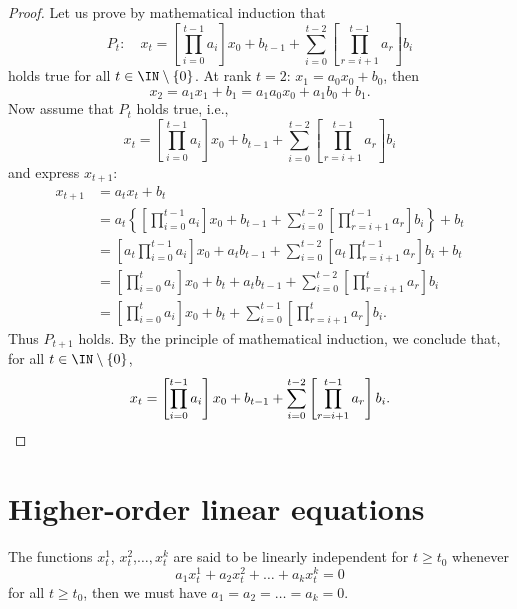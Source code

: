 \begin{proof}
Let us prove by mathematical induction that
\[
P_t:\quad
x_t=\left [\prod_{i=0}^{t-1} a_i\right ]x_0 +b_{t-1}+\sum_{i=0}^{t-2}\left [ \prod_{r=i+1}^{t-1} a_r \right]b_i
\]
holds true for all $t\in \IN\setminus\{0\}$.
At rank $t=2$: $x_1=a_0x_0+b_0$, then
$$x_2=a_1x_1+b_1=a_1a_0x_0+a_1b_0+b_1.$$
Now assume that $P_t$ holds true, i.e., 
$$x_t=\left [\prod_{i=0}^{t-1} a_i\right ]x_0 +b_{t-1}+\sum_{i=0}^{t-2}\left [ \prod_{r=i+1}^{t-1} a_r \right]b_i$$
and express $x_{t+1}$:
\begin{align*}
x_{t+1} &= a_tx_t+b_t \\
&=a_t\left\{\left[\prod_{i=0}^{t-1} a_i\right]x_0 +b_{t-1}
+\sum_{i=0}^{t-2}\left[\prod_{r=i+1}^{t-1} a_r \right]b_i \right\}+b_t \\
&=\left[a_t\prod_{i=0}^{t-1} a_i\right ]x_0+a_tb_{t-1}+\sum_{i=0}^{t-2}\left [ a_t\prod_{r=i+1}^{t-1} a_r \right]b_i+b_t \\
&=\left [\prod_{i=0}^{t} a_i\right ]x_0+b_t+a_tb_{t-1}+\sum_{i=0}^{t-2}\left [ \prod_{r=i+1}^{t} a_r \right]b_i \\
&= \left [\prod_{i=0}^{t} a_i\right ]x_0+b_t
+\sum_{i=0}^{t-1}\left [ \prod_{r=i+1}^{t} a_r \right]b_i.
\end{align*}
Thus $P_{t+1}$ holds.
By the principle of mathematical induction, we conclude that, for all $t\in\IN\setminus\{0\}$, 
$$x_t=\left [\prod_{i=0}^{t-1} a_i\right ]x_0 +b_{t-1}+\sum_{i=0}^{t-2}\left [ \prod_{r=i+1}^{t-1} a_r \right]b_i.\qedhere$$
\end{proof}

\section{Higher-order linear equations}
\begin{definition}
The functions $x_t^1$, $x_t^2$,$\dots, x_t^k$ are said to be linearly independent for $t\geq t_0$ whenever 
$$a_1x^1_t+a_2x^2_t+\dots + a_kx^k_t=0$$
for all $t\geq t_0$, then we must have $a_1=a_2= \dots =a_k=0$.
\end{definition}

